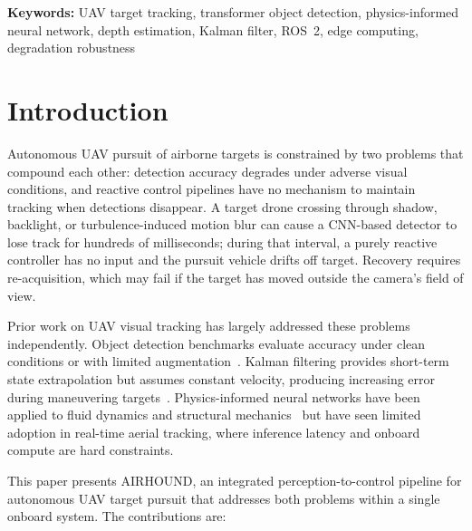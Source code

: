 \documentclass[11pt,letterpaper]{article}
\begin{document}
\noindent\textbf{Keywords:} UAV target tracking, transformer object detection, physics-informed neural network, depth estimation, Kalman filter, ROS~2, edge computing, degradation robustness

\section{Introduction}
\label{sec:intro}

Autonomous UAV pursuit of airborne targets is constrained by two problems that compound each other: detection accuracy degrades under adverse visual conditions, and reactive control pipelines have no mechanism to maintain tracking when detections disappear. A target drone crossing through shadow, backlight, or turbulence-induced motion blur can cause a CNN-based detector to lose track for hundreds of milliseconds; during that interval, a purely reactive controller has no input and the pursuit vehicle drifts off target. Recovery requires re-acquisition, which may fail if the target has moved outside the camera's field of view.

Prior work on UAV visual tracking has largely addressed these problems independently. Object detection benchmarks evaluate accuracy under clean conditions or with limited augmentation~\cite{ultralytics2023,carion2020detr}. Kalman filtering provides short-term state extrapolation but assumes constant velocity, producing increasing error during maneuvering targets~\cite{kalmanfilter1960}. Physics-informed neural networks have been applied to fluid dynamics and structural mechanics~\cite{raissi2019pinn} but have seen limited adoption in real-time aerial tracking, where inference latency and onboard compute are hard constraints.

This paper presents AIRHOUND, an integrated perception-to-control pipeline for autonomous UAV target pursuit that addresses both problems within a single onboard system. The contributions are:
\end{document}
